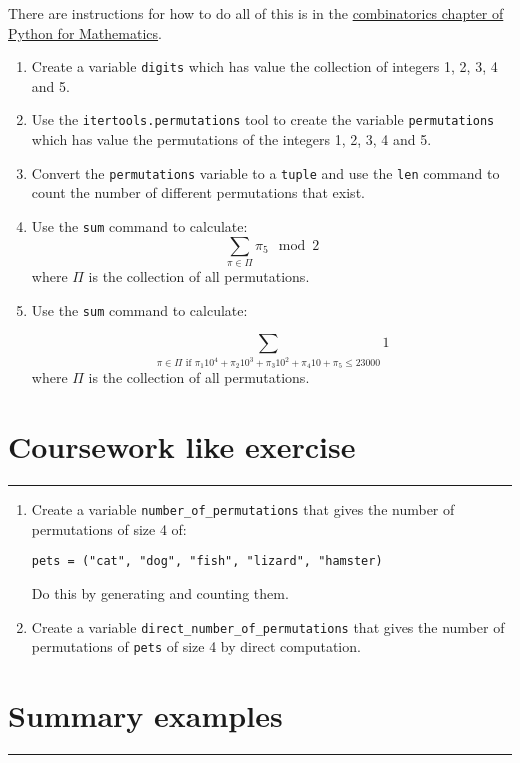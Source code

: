 \documentclass{article}
\begin{document}
There are instructions for how to do all of this is in the
\href{https://vknight.org/pfm/tools-for-mathematics/05-combinations-permutations/how/main.html}{combinatorics chapter of Python for Mathematics}.


\begin{enumerate}
    \item Create a variable \texttt{digits} which has value the
        collection of integers 1, 2, 3, 4 and 5.
\item
    Use the \texttt{itertools.permutations} tool to create the
        variable \texttt{permutations} which has value the
        permutations of the integers 1, 2, 3, 4 and 5. 
    \item Convert the \texttt{permutations} variable to a
        \texttt{tuple} and use the \texttt{len} command
        to count the number of different permutations that exist.
    \item Use the \texttt{sum} command to calculate:
        \[\sum_{\pi \in \Pi}\pi_5\mod 2\] where $\Pi$ is the collection of all
        permutations. 
    \item Use the \texttt{sum} command to calculate:

        \[\sum_{\pi \in \Pi \text{ if }\pi_1 10 ^ 4 + \pi_2 10 ^ 3 + \pi_3 10 ^ 2 + \pi_4 10 + \pi_5 \leq 23000} 1 \] 
        where $\Pi$ is the collection of all
        permutations. 
\end{enumerate}


\section{Coursework like exercise}
\hrule


\begin{enumerate}
    \item Create a variable \texttt{number_of_permutations} that gives the 
number of permutations of size 4 of:

\texttt{pets = ("cat", "dog", "fish", "lizard", "hamster)}

Do this by generating and counting them.
\item Create a variable \texttt{direct_number_of_permutations} that gives 
    the number of permutations of \texttt{pets} of size 4 by 
        direct computation.
\end{enumerate}

\section{Summary examples}
\hrule
\end{document}
